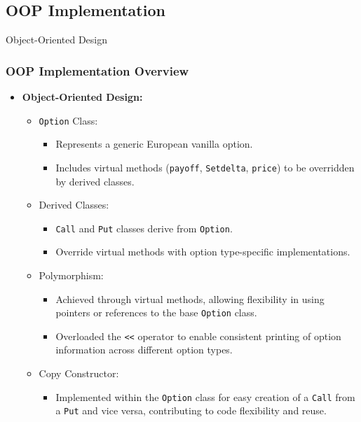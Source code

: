 \documentclass{beamer}
\begin{document}
\subsection{OOP Implementation}
\begin{frame}{Object-Oriented Design}
  \frametitle{OOP Implementation Overview}

  \begin{itemize}
    \item \textbf{Object-Oriented Design:}
      \begin{itemize}
        \item \texttt{Option} Class:
          \begin{itemize}
            \item Represents a generic European vanilla option.
            \item Includes virtual methods (\texttt{payoff}, \texttt{Setdelta}, \texttt{price}) to be overridden by derived classes.
          \end{itemize}
        \item Derived Classes:
          \begin{itemize}
            \item \texttt{Call} and \texttt{Put} classes derive from \texttt{Option}.
            \item Override virtual methods with option type-specific implementations.
          \end{itemize}
        \item Polymorphism:
          \begin{itemize}
            \item Achieved through virtual methods, allowing flexibility in using pointers or references to the base \texttt{Option} class.
            \item Overloaded the \texttt{<<} operator to enable consistent printing of option information across different option types.
          \end{itemize}
        \item Copy Constructor:
          \begin{itemize}
            \item Implemented within the \texttt{Option} class for easy creation of a \texttt{Call} from a \texttt{Put} and vice versa, contributing to code flexibility and reuse.
          \end{itemize}
      \end{itemize}
  \end{itemize}

\end{frame}
\end{document}
